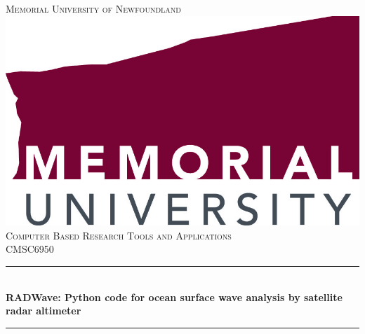 \documentclass[12pt]{article}
\begin{document}
\begin{titlepage}

\newcommand{\HRule}{\rule{\linewidth}{0.5mm}} %

\center %
 

\textsc{ Memorial University of Newfoundland}\\[1.5cm] %
\includegraphics[scale=.1]{MUN_Logo.jpg}\\[1cm] %
\textsc{\Large Computer Based Research Tools and Applications}\\[0.5cm] %
\textsc{\large CMSC6950}\\[0.5cm] %


\HRule \\[0.4cm]
{ \huge \bfseries RADWave: Python code for ocean surface wave analysis by satellite radar altimeter}\\[0.4cm] %
\HRule \\[1.5cm]
 


\end{titlepage}
\end{document}
